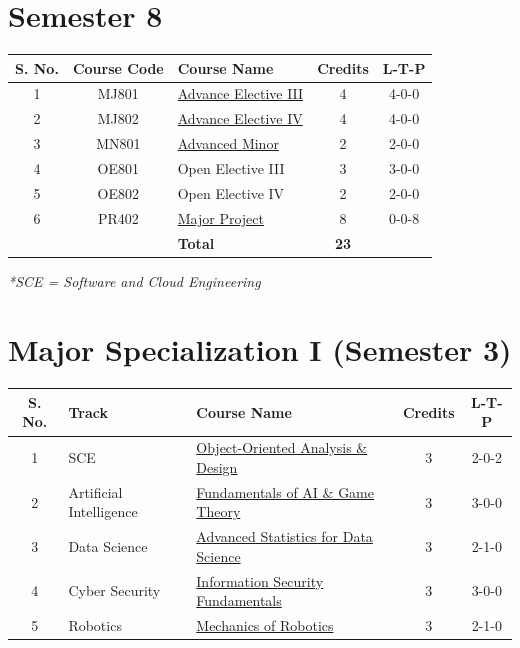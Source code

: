 \section*{Semester 8}
\begin{longtable}{|c|c|p{7cm}|c|c|}
\hline
\textbf{S. No.} & \textbf{Course Code} & \textbf{Course Name} & \textbf{Credits} & \textbf{L-T-P} \\
\hline
1 & MJ801 & \hyperref[table:electives]{Advance Elective III} & 4 & 4-0-0 \\
\hline
2 & MJ802 & \hyperref[table:electives]{Advance Elective IV} & 4 & 4-0-0 \\
\hline
3 & MN801 & \hyperref[table:minor_l2]{Advanced Minor} & 2 & 2-0-0 \\
\hline
4 & OE801 & Open Elective III & 3 & 3-0-0 \\
\hline
5 & OE802 & Open Elective IV & 2 & 2-0-0 \\
\hline
6 & PR402 & \hyperref[course:PR402]{Major Project} & 8 & 0-0-8 \\
\hline
& & \textbf{Total} & \textbf{23} & \\
\hline
\end{longtable}

\newpage


\textit{*SCE = Software and Cloud Engineering}

\label{table:major1}
\section*{Major Specialization I (Semester 3)}
\begin{longtable}{|c|l|p{7cm}|c|c|}
\hline
\textbf{S. No.} & \textbf{Track} & \textbf{Course Name} & \textbf{Credits} & \textbf{L-T-P} \\
\hline
1 & SCE & \hyperref[major:SE_1]{Object-Oriented Analysis \& Design} & 3 & 2-0-2 \\
\hline
2 & Artificial Intelligence & \hyperref[major:ML_1]{Fundamentals of AI \& Game Theory} & 3 & 3-0-0 \\
\hline
3 & Data Science & \hyperref[major:DS_1]{Advanced Statistics for Data Science} & 3 & 2-1-0 \\
\hline
4 & Cyber Security & \hyperref[major:CS_1]{Information Security Fundamentals} & 3 & 3-0-0 \\
\hline
5 & Robotics & \hyperref[major:RB_1]{Mechanics of Robotics} & 3 & 2-1-0 \\
\hline
\end{longtable}

